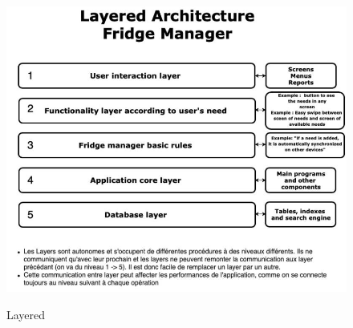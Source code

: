 \documentclass[14pt]
{article}
\begin{document}
\paragraph*{}
\begin{figure}
\includegraphics[width=1\textwidth]{images/tp5_layered_software.JPEG}\\[1cm]
\caption{Layered} 
\end{figure}
 
\end{document}
